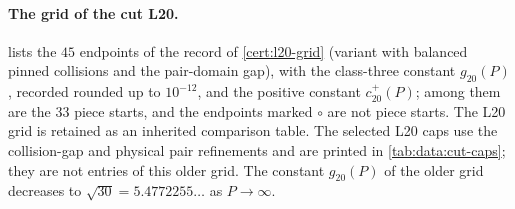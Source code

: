 \paragraph{The grid of the cut L20.}
 lists the $45$ endpoints of the record
 of
\cref{cert:l20-grid} (variant with balanced pinned collisions and the pair-domain
gap), with the class-three constant $g_{20}(P)$, recorded rounded up to
$10^{-12}$, and the positive constant $c^+_{20}(P)$; among them are the $33$
piece starts, and the endpoints marked $\circ$ are not piece starts. The L20
grid is retained as an inherited comparison table. The selected L20 caps
use the collision-gap and physical pair refinements and are printed in
\cref{tab:data:cut-caps}; they are not entries of this older grid. The
constant $g_{20}(P)$ of the older grid decreases to
$\sqrt{30}=5.4772255\ldots$ as $P\to\infty$.

